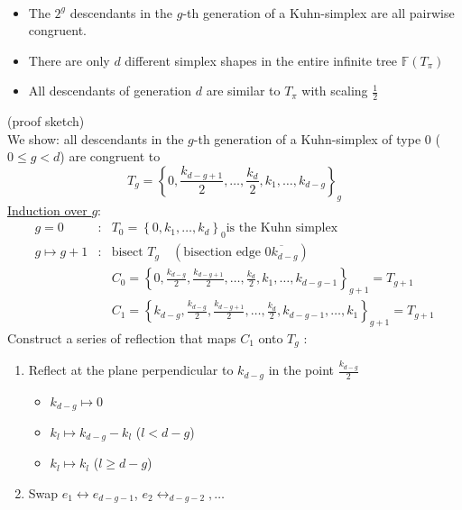 \begin{theorem}\
	\begin{itemize}
		\item The $2^g$ descendants in the $g$-th generation of a Kuhn-simplex are all pairwise congruent.
		\item There are only $d$ different simplex shapes in the entire infinite tree $\mathbb{F}(T_{\pi})$ 
		\item All descendants of generation $d$ are similar to $T_{\pi}$ with scaling $\frac{1}{2}$ 
			
	\end{itemize}
\end{theorem}
\begin{proof_}
	(proof sketch)\\
	We show: all descendants in the $g$-th generation of a Kuhn-simplex of type $0$ ($0 \leq g < d$) are congruent to 
	\begin{equation*}
		T_{g}= \left\{0, \frac{k_{d-g+1}}{2},\dots ,\frac{k_{d}}{2},k_{1},\dots ,k_{d-g} \right\}_{g}
	\end{equation*}
	\underline{Induction over $g$}:
	\begin{align*}
		g=0&: & T_{0}= \left\{0,k_{1},\dots ,k_{d} \right\}_{0} \text{is the Kuhn simplex}\\
		g\mapsto g+1&: &\text{bisect } T_{g}\quad ( \text{bisection edge } \overline{0k_{d-g}})\\
		 && C_{0}= \left\{ 0, \frac{k_{d-g}}{2},\frac{k_{d-g+1}}{2},\dots , \frac{k_{d}}{2},k_{1},\dots ,k_{d-g-1} \right\}_{g+1}= T_{g+1}\\
		 && C_{1}= \left\{ k_{d-g}, \frac{k_{d-g}}{2},\frac{k_{d-g+1}}{2},\dots , \frac{k_{d}}{2},k_{d-g-1},\dots ,k_{1} \right\}_{g+1}= T_{g+1}
	\end{align*}
	Construct a series of reflection that maps $C_{1}$ onto $T_{g}$ :
	\begin{enumerate}
		\item Reflect at the plane perpendicular to $k_{d-g}$ in the point $\frac{k_{d-g}}{2}$ 
			\begin{itemize}
				\item $k_{d-g} \mapsto 0$ 
				\item $k_{l} \mapsto k_{d-g}-k_{l}$ ($l < d-g$)
				\item $k_{l} \mapsto k_{l}$ ($l \geq d-g$)
			\end{itemize}
		\item Swap $e_{1}\leftrightarrow e_{d-g-1}$, $e_{2} \leftrightarrow_{d-g-2},\dots $

\end{enumerate}
\end{proof_}
